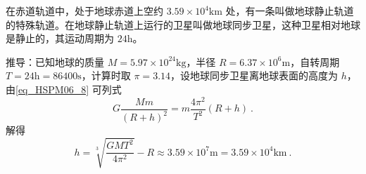 在赤道轨道中，处于地球赤道上空约 $3.59\times10^4\mathrm{km}$ 处，有一条叫做地球静止轨道的特殊轨道。在地球静止轨道上运行的卫星叫做地球同步卫星，这种卫星相对地球是静止的，其运动周期为 $24\mathrm{h}$。

推导：已知地球的质量 $M=5.97\times10^{24}\mathrm{kg}$，半径 $R=6.37\times10^6\mathrm{m}$，自转周期 $T=24\mathrm{h}=86400\mathrm{s}$，计算时取 $\pi=3.14$，设地球同步卫星离地球表面的高度为 $h$，由\autoref{eq_HSPM06_8} 可列式
\begin{equation}
G\frac{Mm}{(R+h)^2}= m\frac{4\pi^2}{T^2}(R+h)~.
\end{equation}
解得
\begin{equation}
h=\sqrt[3]{\frac{GMT^2}{4\pi^2}}-R \approx 3.59\times10^7\mathrm{m}=3.59\times10^4\mathrm{km}~.
\end{equation}
